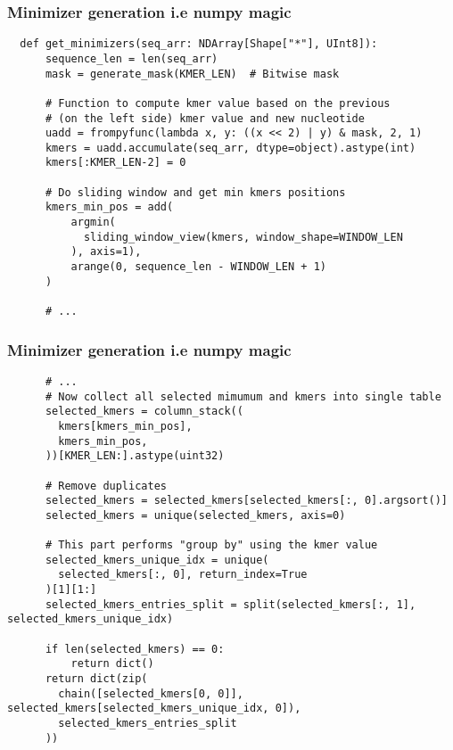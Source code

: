 \documentclass{beamer}
\begin{document}
\begin{frame}[fragile]
  \frametitle{Minimizer generation i.e numpy magic}

  \begin{verbatim}
  def get_minimizers(seq_arr: NDArray[Shape["*"], UInt8]): 
      sequence_len = len(seq_arr)
      mask = generate_mask(KMER_LEN)  # Bitwise mask

      # Function to compute kmer value based on the previous
      # (on the left side) kmer value and new nucleotide
      uadd = frompyfunc(lambda x, y: ((x << 2) | y) & mask, 2, 1)
      kmers = uadd.accumulate(seq_arr, dtype=object).astype(int)
      kmers[:KMER_LEN-2] = 0
      
      # Do sliding window and get min kmers positions
      kmers_min_pos = add(
          argmin(
            sliding_window_view(kmers, window_shape=WINDOW_LEN
          ), axis=1),
          arange(0, sequence_len - WINDOW_LEN + 1)
      )
      
      # ...
  \end{verbatim}
\end{frame}

\begin{frame}[fragile]
  \frametitle{Minimizer generation i.e numpy magic}

  \begin{verbatim}
      # ...
      # Now collect all selected mimumum and kmers into single table
      selected_kmers = column_stack((
        kmers[kmers_min_pos],
        kmers_min_pos,
      ))[KMER_LEN:].astype(uint32)

      # Remove duplicates
      selected_kmers = selected_kmers[selected_kmers[:, 0].argsort()]
      selected_kmers = unique(selected_kmers, axis=0)

      # This part performs "group by" using the kmer value
      selected_kmers_unique_idx = unique(
        selected_kmers[:, 0], return_index=True
      )[1][1:]
      selected_kmers_entries_split = split(selected_kmers[:, 1], selected_kmers_unique_idx)

      if len(selected_kmers) == 0:
          return dict()
      return dict(zip(
        chain([selected_kmers[0, 0]], selected_kmers[selected_kmers_unique_idx, 0]),
        selected_kmers_entries_split
      ))
  \end{verbatim}
\end{frame}
\end{document}
